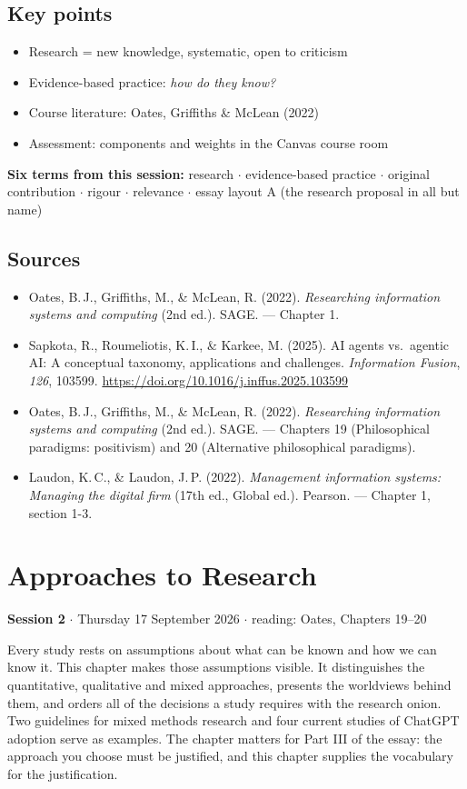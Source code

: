 \documentclass[11pt,a4paper,british,twoside=false,headings=small,chapterprefix=false,numbers=noenddot]{scrbook}
\newcommand{\sessionhead}[2]{\begin{tcolorbox}[enhanced, colback=uiamutedblue, colframe=uiamutedblue, arc=1.5pt, left=6pt, right=6pt]
  \small \textbf{Session #1} \;$\cdot$\; #2\end{tcolorbox}}
\begin{document}
\section*{Key points}
\begin{itemize}
  \item Research = new knowledge, systematic, open to criticism
  \item Evidence-based practice: \emph{how do they know?}
  \item Course literature: Oates, Griffiths \& McLean (2022)
  \item Assessment: components and weights in the Canvas course room
\end{itemize}
\medskip\noindent\textbf{Six terms from this session:} research $\cdot$ evidence-based practice $\cdot$ original contribution $\cdot$ rigour $\cdot$ relevance $\cdot$ essay layout A (the research proposal in all but name)

\section*{Sources}
\begin{itemize}\small
  \item Oates, B.\,J., Griffiths, M., \& McLean, R. (2022). \emph{Researching information systems and computing} (2nd ed.). SAGE. --- Chapter 1.
  \item Sapkota, R., Roumeliotis, K.\,I., \& Karkee, M. (2025). AI agents vs.\ agentic AI: A conceptual taxonomy, applications and challenges. \emph{Information Fusion}, \emph{126}, 103599. \url{https://doi.org/10.1016/j.inffus.2025.103599}
  \item Oates, B.\,J., Griffiths, M., \& McLean, R. (2022). \emph{Researching information systems and computing} (2nd ed.). SAGE. --- Chapters 19 (Philosophical paradigms: positivism) and 20 (Alternative philosophical paradigms).
  \item Laudon, K.\,C., \& Laudon, J.\,P. (2022). \emph{Management information systems: Managing the digital firm} (17th ed., Global ed.). Pearson. --- Chapter 1, section 1-3.
\end{itemize}

\chapter{Approaches to Research}
\label{ch:2}
\sessionhead{2}{Thursday 17 September 2026 \;$\cdot$\; reading: Oates, Chapters 19--20}

Every study rests on assumptions about what can be known and how we can know it. This chapter makes those assumptions visible. It distinguishes the quantitative, qualitative and mixed approaches, presents the worldviews behind them, and orders all of the decisions a study requires with the research onion. Two guidelines for mixed methods research and four current studies of ChatGPT adoption serve as examples. The chapter matters for Part III of the essay: the approach you choose must be justified, and this chapter supplies the vocabulary for the justification.
\end{document}
